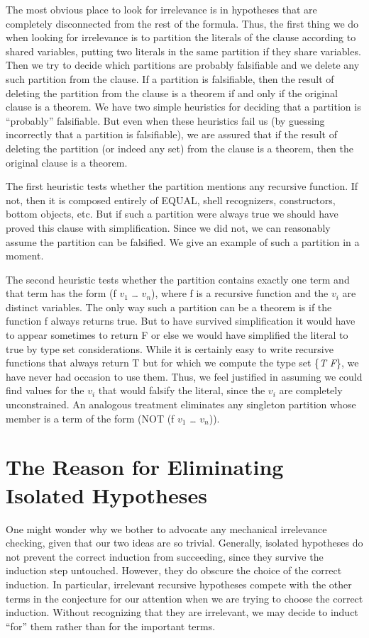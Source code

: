 \documentclass[10pt]{book}
\begin{document}
The most obvious place to look for irrelevance is
in hypotheses that are completely disconnected from the rest of
the formula.  Thus, the first thing we do when looking for
irrelevance is to partition the literals
of the clause according to shared variables, putting two literals
in the same partition if they share
variables.  Then we try to decide which partitions are probably falsifiable
and we delete any such partition from the clause.
If a partition is falsifiable, then the result
of deleting the partition from the clause is a theorem
if and only if the original clause is a theorem.
We have two simple heuristics for deciding that a partition
is ``probably'' falsifiable.  But even when these
heuristics fail us (by guessing incorrectly
that a partition is falsifiable), we are assured
that if the result of deleting the partition (or indeed any
set) from the clause is a theorem, then
the original clause is a theorem.

The first heuristic tests whether the partition mentions any recursive
function.  If not, then it is composed entirely of EQUAL, shell recognizers,
constructors, bottom objects, etc.  But if such a partition were
always true we should have proved this clause with simplification.
Since we did not, we can reasonably
assume the partition can be falsified.
We give an example of such a partition in a moment.

The second heuristic tests whether the partition contains exactly one term
and that term has the form (f $v_{1}$ \ldots{} $v_{n}$), where f is a recursive
function and the $v_{i}$ are distinct variables.
The only way such a partition can be a theorem is if the function
f always returns true.  But to have survived simplification it would
have to appear sometimes to return F or else we would have simplified
the literal to true by type set considerations.  While it is certainly
easy to write recursive functions that always return T
but for which we compute the type set \{\emph{T} \emph{F}\},
we have never had occasion to use them.
Thus, we feel justified in assuming we could find values for the $v_{i}$
that would falsify the literal, since the $v_{i}$ are completely
unconstrained.  An analogous treatment eliminates
any singleton partition whose member is a term
of the form (NOT (f $v_{1}$ \ldots{} $v_{n}$)).

\section{The Reason for Eliminating Isolated Hypotheses}
One might wonder why we bother to advocate any mechanical irrelevance
checking, given that our two ideas are so trivial.
Generally, isolated hypotheses do not prevent the correct induction from
succeeding, since they survive the induction step untouched.
However, they do obscure the choice of  the correct induction.
In particular, irrelevant recursive hypotheses
compete with the other terms in the conjecture for
our attention when we are trying to choose the correct induction.  Without recognizing
that they are irrelevant, we may decide to induct ``for'' them rather than for the important terms.
\end{document}
